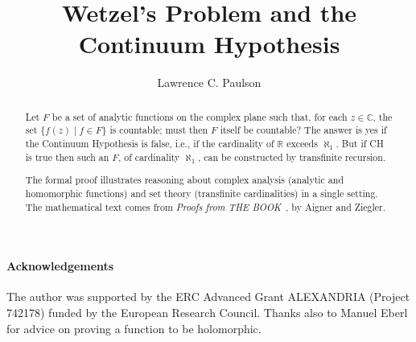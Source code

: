 \documentclass[11pt,a4paper]{article}
\begin{document}
\title{Wetzel's Problem and the Continuum Hypothesis}
\author{Lawrence C. Paulson}
\maketitle

\begin{abstract}
Let $F$ be a set of analytic functions on the complex plane such that, 
for each $z\in\mathbb{C}$, the set $\{f(z) \mid f\in F\}$ is countable;
must then $F$ itself be countable?
The answer is yes if the Continuum Hypothesis is false, i.e.,
if the cardinality of $\mathbb{R}$ exceeds $\aleph_1$.
But if CH is true then such an $F$, of cardinality $\aleph_1$,
can be constructed by transfinite recursion.

The formal proof illustrates reasoning about complex 
analysis (analytic and homomorphic functions) and set theory
(transfinite cardinalities) in a single setting.
The mathematical text comes from \emph{Proofs from THE BOOK}~\cite[pp.--8]{aigner-proofs}, by Aigner and Ziegler. 
\end{abstract}

\newpage
\tableofcontents

\paragraph*{Acknowledgements}
The author was supported by the ERC Advanced Grant ALEXANDRIA (Project 742178) funded by the European Research Council. 
Thanks also to Manuel Eberl for advice on proving a function to be holomorphic.

\newpage





\end{document}
